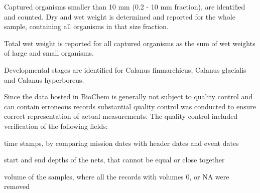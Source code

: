 \documentclass[letterpaper,portrait,12pt]{scrartcl}
\numberwithin{equation}{section}		%
\numberwithin{figure}{section}			%
\numberwithin{table}{section}				%
\begin{document}
\begin{flushleft}

	Captured organisms smaller than 10 mm (0.2 - 10 mm fraction), are identified and counted. Dry and wet weight is determined and reported for the whole sample, containing all organisms in that size fraction.

\end{flushleft}







\begin{flushleft}

	Total wet weight is reported for all captured organisms as the sum of wet weights of large and small organisms. 

\end{flushleft}







\begin{flushleft}

	Developmental stages are identified for Calanus finmarchicus, Calanus glacialis and Calanus hyperboreus.

\end{flushleft}








Since the data hosted in BioChem is generally not subject to quality control and can contain erroneous records substantial quality control was conducted to ensure correct representation of actual measurements. The quality control included verification of the following fields: 








\begin{flushleft}

	time stamps, by comparing mission dates with header dates and event dates 

\end{flushleft}


\begin{flushleft}

	start and end depths of the nets, that cannot be equal or close together

\end{flushleft}


\begin{flushleft}

	volume of the samples, where all the records with volumes 0, or NA were removed

\end{flushleft}
\end{document}
